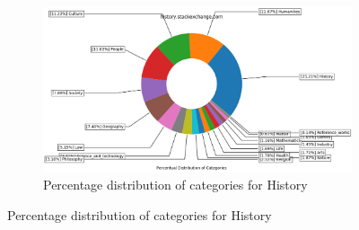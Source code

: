 \begin{figure}[H]
     \begin{subfigure}{0.9\textwidth}
    \centering
        \includegraphics[width=1\linewidth]{imgs/percentual-distribution/history_stackexchange_com_donut}
        \caption{Percentage distribution of categories for History}
        \label{fig:percentage-distribution-history}
    \end{subfigure}%
    

 \end{figure}
 
